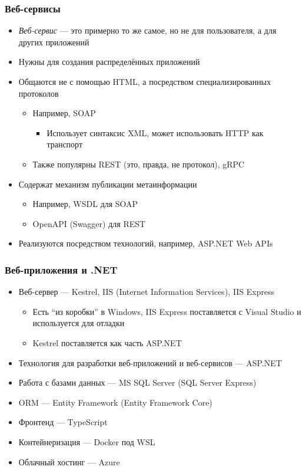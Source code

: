 \documentclass{../../slides-style}
\begin{document}
    \begin{frame}
        \frametitle{Веб-сервисы}
        \begin{itemize}
            \item \textit{Веб-сервис} --- это примерно то же самое, но не для пользователя, а для других приложений
            \item Нужны для создания распределённых приложений
            \item Общаются не с помощью HTML, а посредством специализированных протоколов
            \begin{itemize}
                \item Например, SOAP
                \begin{itemize}
                    \item Использует синтаксис XML, может использовать HTTP как транспорт
                \end{itemize}
                \item Также популярны REST (это, правда, не протокол), gRPC
            \end{itemize}
            \item Содержат механизм публикации метаинформации
            \begin{itemize}
                \item Например, WSDL для SOAP
                \item OpenAPI (Swagger) для REST
            \end{itemize}
            \item Реализуются посредством технологий, например, ASP.NET Web APIs
        \end{itemize}
    \end{frame}

    \begin{frame}
        \frametitle{Веб-приложения и .NET}
        \begin{itemize}
            \item Веб-сервер --- Kestrel, IIS (Internet Information Services), IIS Express
            \begin{itemize}
                \item Есть ``из коробки'' в Windows, IIS Express поставляется с Visual Studio и используется для отладки
                \item Kestrel поставляется как часть ASP.NET
            \end{itemize}
            \item Технология для разработки веб-приложений и веб-сервисов --- ASP.NET
            \item Работа с базами данных --- MS SQL Server (SQL Server Express)
            \item ORM --- Entity Framework (Entity Framework Core)
            \item Фронтенд --- TypeScript
            \item Контейнеризация --- Docker под WSL
            \item Облачный хостинг --- Azure
        \end{itemize}
    \end{frame}
\end{document}
